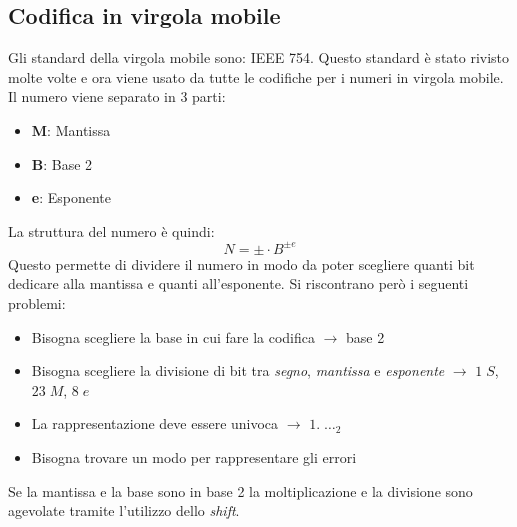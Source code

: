 \documentclass[a4paper]{article}
\theoremstyle{break}
\theoremstyle{break}
\theoremstyle{break}
\theoremstyle{break}
\begin{document}
\subsection{Codifica in virgola mobile}
Gli standard della virgola mobile sono: IEEE 754. Questo standard
è stato rivisto molte volte e ora viene usato da tutte le codifiche per i numeri in
virgola mobile.\\
Il numero viene separato in 3 parti:
\begin{itemize}
	\item \textbf{M}: Mantissa
	\item \textbf{B}: Base 2
	\item \textbf{e}: Esponente
\end{itemize}
La struttura del numero è quindi:
\[
	N = \pm \cdot B^{\pm e}
\]
Questo permette di dividere il numero in modo da poter scegliere quanti bit dedicare
alla mantissa e quanti all'esponente. Si riscontrano però i seguenti problemi:
\begin{itemize}
	\item Bisogna scegliere la base in cui fare la codifica \(\to\)  base 2
	\item Bisogna scegliere la divisione di bit tra \emph{segno}, \emph{mantissa} e \emph{esponente} \( \to \)   \( 1\; S \), \( 23\; M \), \( 8\; e \)
	\item La rappresentazione deve essere univoca \( \to \)  \( 1.\; \ldots_2 \)
	\item Bisogna trovare un modo per rappresentare gli errori
\end{itemize}
Se la mantissa e la base sono in base 2 la moltiplicazione e la
divisione sono agevolate tramite l'utilizzo dello \emph{shift}.
\end{document}
